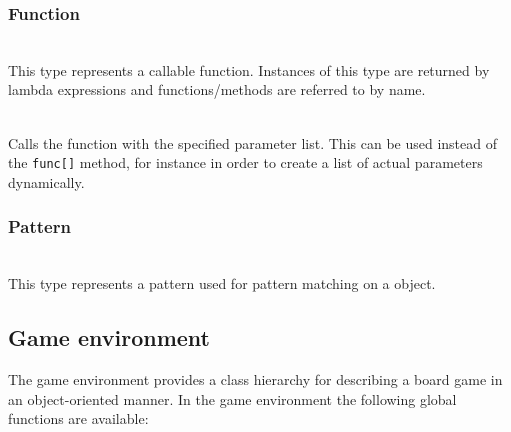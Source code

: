 \subsubsection{Function}
\begin{dlist}
\item {}\\
    This type represents a callable function. Instances of this type are
    returned by lambda expressions and functions/methods are referred to by
    name.
  \item {}\\
    Calls the function with the specified parameter list. This can be used
    instead of the \texttt{func[]} method, for instance in order to create a
    list of actual parameters dynamically.
\end{dlist}

\subsubsection{Pattern}
\begin{dlist}
  \item {}\\
    This type represents a pattern used for pattern matching on a  object.
\end{dlist}

\subsection{Game environment}
\label{sec:gameenvironment}

The game environment provides a class hierarchy for describing a board game in
an object-oriented manner. In the game environment the following global
functions are available:

